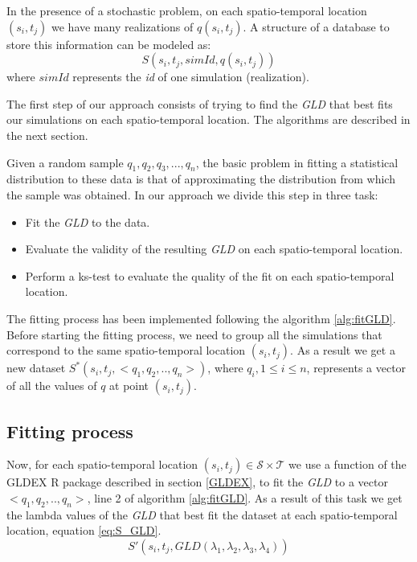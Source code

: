 In the presence of a stochastic problem, on each spatio-temporal location $(s_{i},t_{j})$ we have many realizations of $q(s_{i},t_{j})$. A structure of a database to store this information can be modeled as:
\begin{equation}\label{eq:data_base_structure}
S(s_{i},t_{j},simId,q(s_{i},t_{j}))
\end{equation}
where $simId$ represents the \textit{id} of one simulation (realization).

The first step of our approach consists of trying to find the \textit{GLD} that best fits our simulations on each spatio-temporal location. The algorithms are described in the next section.

Given a random sample $q_{1}, q_{2}, q_{3},...,q_{n}$, the basic problem in fitting a statistical distribution to these data is that of approximating the distribution from which the sample was obtained. In our approach we divide this step in three task:
\begin{itemize}
\item Fit the \textit{GLD} to the data.
\item Evaluate the validity of the resulting \textit{GLD} on each spatio-temporal location.
\item Perform a ks-test to evaluate the quality of the fit on each spatio-temporal location.
\end{itemize}

The fitting process has been implemented following the algorithm \ref{alg:fitGLD}. Before starting the fitting process, we need to group all the simulations that correspond to the same spatio-temporal location $(s_{i},t_{j})$.  As a result we get a new dataset $S^*(s_{i},t_{j},<q_1,q_2,..,q_n>)$, where $q_i, 1 \le i \le n$, represents a vector of all the values of $q$ at point $(s_{i},t_{j})$.

\subsection{Fitting process}
\label{gldFitProcess}
Now, for each spatio-temporal location $(s_{i},t_{j}) \in \mathcal{S} \times \mathcal{T}$ we use a function of the GLDEX R package described in section \ref{GLDEX}, to fit the \textit{GLD} to a vector $<q_1,q_2,..,q_n>$, line 2 of algorithm \ref{alg:fitGLD}. As a result of this task we get the lambda values of the \textit{GLD} that best fit the dataset at each spatio-temporal location, equation \ref{eq:S_GLD}.
\begin{equation}\label{eq:S_GLD}
S'(s_{i},t_{j},GLD(\lambda_{1}, \lambda_{2}, \lambda_{3}, \lambda_{4}))
\end{equation}

